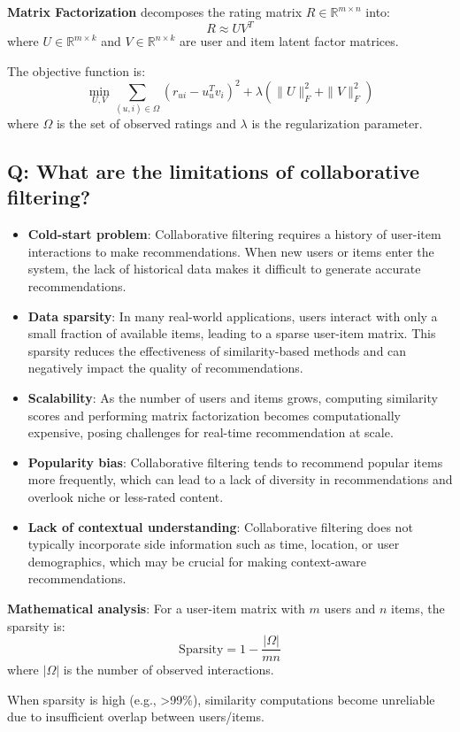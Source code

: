 \textbf{Matrix Factorization} decomposes the rating matrix \(R \in \mathbb{R}^{m \times n}\) into:
\[
	R \approx UV^T
\]
where \(U \in \mathbb{R}^{m \times k}\) and \(V \in \mathbb{R}^{n \times k}\) are user and item latent factor matrices.

The objective function is:
\[
	\min_{U, V} \sum_{(u,i) \in \Omega} (r_{ui} - u_u^T v_i)^2 + \lambda(\|U\|_F^2 + \|V\|_F^2)
\]
where \(\Omega\) is the set of observed ratings and \(\lambda\) is the regularization parameter.

\subsection*{Q: What are the limitations of collaborative filtering?}
\begin{itemize}
	\item \textbf{Cold-start problem}: Collaborative filtering requires a history of user-item interactions to make recommendations. When new users or items enter the system, the lack of historical data makes it difficult to generate accurate recommendations.
	\item \textbf{Data sparsity}: In many real-world applications, users interact with only a small fraction of available items, leading to a sparse user-item matrix. This sparsity reduces the effectiveness of similarity-based methods and can negatively impact the quality of recommendations.
	\item \textbf{Scalability}: As the number of users and items grows, computing similarity scores and performing matrix factorization becomes computationally expensive, posing challenges for real-time recommendation at scale.
	\item \textbf{Popularity bias}: Collaborative filtering tends to recommend popular items more frequently, which can lead to a lack of diversity in recommendations and overlook niche or less-rated content.
	\item \textbf{Lack of contextual understanding}: Collaborative filtering does not typically incorporate side information such as time, location, or user demographics, which may be crucial for making context-aware recommendations.
\end{itemize}

\textbf{Mathematical analysis}:
For a user-item matrix with \(m\) users and \(n\) items, the sparsity is:
\[
	\text{Sparsity} = 1 - \frac{|\Omega|}{mn}
\]
where \(|\Omega|\) is the number of observed interactions.

When sparsity is high (e.g., >99\%), similarity computations become unreliable due to insufficient overlap between users/items.

